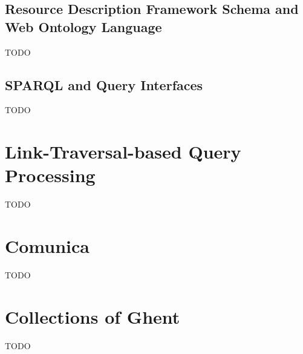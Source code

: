 \subsection{Resource Description Framework Schema and Web Ontology Language}
\label{subsec:rdfs_owl}

TODO

\subsection{SPARQL and Query Interfaces}
\label{subsec:sparql}

TODO

\section{Link-Traversal-based Query Processing}
\label{sec:ltqp}

TODO

\section{Comunica}
\label{sec:comunica}

TODO

\section{Collections of Ghent}
\label{sec:coghent}

TODO

